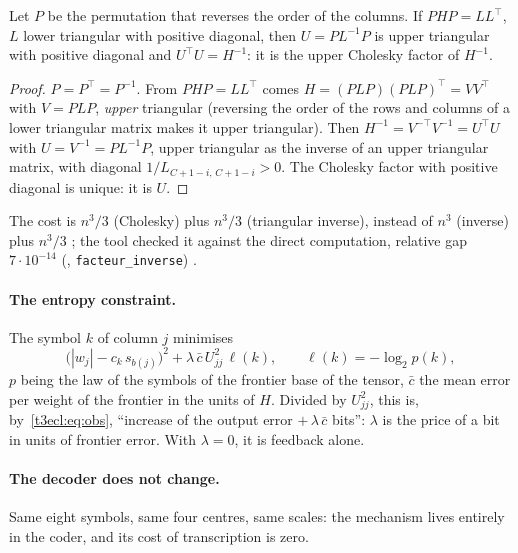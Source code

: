 \begin{lemme}\label{t3ecl:lem:chol}
Let $P$ be the permutation that reverses the order of the columns. If $PHP = LL^\top$, $L$ lower triangular with positive diagonal, then $U = P L^{-1} P$ is upper triangular with positive diagonal and $U^\top U = H^{-1}$: it is the upper Cholesky factor of $H^{-1}$.
\end{lemme}

\begin{proof}
$P = P^\top = P^{-1}$. From $PHP = LL^\top$ comes $H = (PLP)(PLP)^\top = VV^\top$ with $V = PLP$, \emph{upper} triangular (reversing the order of the rows and columns of a lower triangular matrix makes it upper triangular). Then $H^{-1} = V^{-\top} V^{-1} = U^\top U$ with $U = V^{-1} = P L^{-1} P$, upper triangular as the inverse of an upper triangular matrix, with diagonal $1/L_{C+1-i,\,C+1-i} > 0$. The Cholesky factor with positive diagonal is unique: it is $U$.
\end{proof}

The cost is $n^3/3$ (Cholesky) plus $n^3/3$ (triangular inverse), instead of $n^3$ (inverse) plus $n^3/3$ \calc; the tool checked it against the direct computation, relative gap $7\cdot10^{-14}$ (, \texttt{facteur\_inverse}) \mes.

\paragraph{The entropy constraint.} The symbol $k$ of column $j$ minimises
\begin{equation}\label{t3ecl:eq:lagrange}
\bigl(|w_j| - c_k\, s_{b(j)}\bigr)^2 + \lambda\, \bar c\, U_{jj}^2\, \ell(k), \qquad \ell(k) = -\log_2 p(k),
\end{equation}
$p$ being the law of the symbols of the frontier base of the tensor, $\bar c$ the mean error per weight of the frontier in the units of $H$. Divided by $U_{jj}^2$, this is, by~\eqref{t3ecl:eq:obs}, ``increase of the output error $+\,\lambda\,\bar c$ bits'': $\lambda$ is the price of a bit in units of frontier error. With $\lambda = 0$, it is feedback alone.

\paragraph{The decoder does not change.} Same eight symbols, same four centres, same scales: the mechanism lives entirely in the coder, and its cost of transcription is zero.

